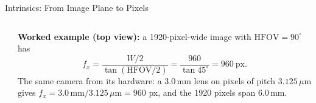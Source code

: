 \begin{frame}{Intrinsics: From Image Plane to Pixels}
\begin{columns}[T,onlytextwidth]
\\[0.6em]
      \begin{minipage}{\linewidth}\scriptsize\raggedright
        \textbf{Worked example (top view):} a 1920-pixel-wide image with $\mathrm{HFOV}=90^\circ$ has
        \[ f_x=\frac{W/2}{\tan(\mathrm{HFOV}/2)}=\frac{960}{\tan45^\circ}=960\ \text{px}. \]
        The same camera from its hardware: a 3.0\,mm lens on pixels of pitch $3.125\,\mu\mathrm{m}$ gives $f_x=3.0\,\mathrm{mm}/3.125\,\mu\mathrm{m}=960$ px, and the 1920 pixels span 6.0\,mm.
      \end{minipage}
  \end{columns}
\end{frame}

